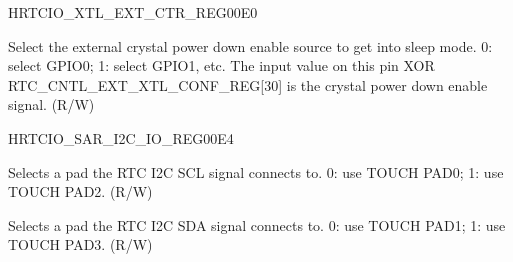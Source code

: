 \begin{register}{H}{RTCIO\_XTL\_EXT\_CTR\_REG}{\hexprefix{}00E0}\label{regdesc:RTCIOXTLEXTCTRREG}
%
%
\regnewline%
\begin{regdesc}\begin{reglist}
\label{fielddesc:RTCIOXTLEXTCTRSEL}\item [RTCIO\_XTL\_EXT\_CTR\_SEL] Select the external crystal power down enable source to get into sleep mode.
0: select GPIO0; 1: select GPIO1, etc. The input value on this pin XOR RTC\_CNTL\_EXT\_XTL\_CONF\_REG[30] is the crystal power down enable signal. (R/W)
\end{reglist}\end{regdesc}
\end{register}


\begin{register}{H}{RTCIO\_SAR\_I2C\_IO\_REG}{\hexprefix{}00E4}\label{regdesc:RTCIOSARI2CIOREG}
%
%
%
\regnewline%
\begin{regdesc}\begin{reglist}
\label{fielddesc:RTCIOSARI2CSCLSEL}\item [RTCIO\_SAR\_I2C\_SCL\_SEL] Selects a pad the RTC I2C SCL signal connects to. 0: use TOUCH PAD0; 1: use TOUCH PAD2. (R/W)
\label{fielddesc:RTCIOSARI2CSDASEL}\item [RTCIO\_SAR\_I2C\_SDA\_SEL] Selects a pad the RTC I2C SDA signal connects to. 0: use TOUCH PAD1; 1: use TOUCH PAD3. (R/W)
\end{reglist}\end{regdesc}
\end{register}

